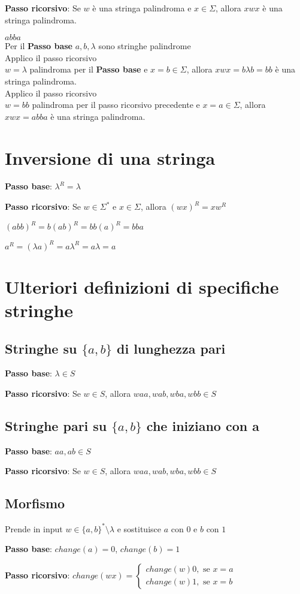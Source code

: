 \textbf{Passo ricorsivo}: Se $w$ è una stringa palindroma e $x \in \Sigma$, allora $xwx$ è una  stringa palindroma.
\begin{example}
$abba$ \\
Per il \textbf{Passo base} $a, b, \lambda$ sono stringhe palindrome \\
Applico il passo ricorsivo \\
$w = \lambda$ palindroma per il \textbf{Passo base} e $x = b \in \Sigma$, allora $xwx = b \lambda b = bb$ è una stringa palindroma. \\
Applico il passo ricorsivo \\
$w = bb$ palindroma per il passo ricorsivo precedente e $x = a \in \Sigma$, allora $xwx = abba$ è una stringa palindroma.
\end{example}

\section{Inversione di una stringa}
\textbf{Passo base}: $\lambda^R = \lambda$

\textbf{Passo ricorsivo}: Se $w \in \Sigma^*$ e $x \in \Sigma$, allora $(wx)^R = xw^R$

\begin{example}
$(abb)^R = b(ab)^R = bb(a)^R = bba$
\end{example}
\begin{example}
$a^R = (\lambda a)^R = a \lambda^R = a \lambda = a$
\end{example}

\section{Ulteriori definizioni di specifiche stringhe}
\subsection{Stringhe su $\{a, b\}$ di lunghezza pari}
\textbf{Passo base}: $\lambda \in S$

\textbf{Passo ricorsivo}: Se $w \in S$, allora $waa, wab, wba, wbb \in S$

\subsection{Stringhe pari su $\{a, b\}$ che iniziano con a}
\textbf{Passo base}: $aa, ab \in S$

\textbf{Passo ricorsivo}: Se $w \in S$, allora $waa, wab, wba, wbb \in S$

\subsection{Morfismo}
Prende in input $w \in \{a, b\}^* \setminus \lambda$ e sostituisce $a$ con $0$ e $b$ con $1$

\textbf{Passo base}: $change(a)=0$, $change(b)=1$

\textbf{Passo ricorsivo}: $change(wx)= \begin{cases} change(w)0, \text{ se } x=a \\ change(w)1, \text{ se } x=b \end{cases}$